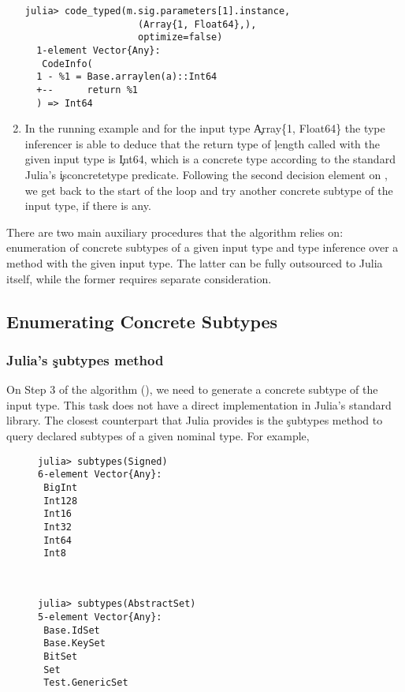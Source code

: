 \begin{enumerate}
\begin{minipage}{.92\textwidth}
\begin{lstlisting}[style=jterm]
  julia> code_typed(m.sig.parameters[1].instance,
                    (Array{1, Float64},),
                    optimize=false)
  1-element Vector{Any}:
   CodeInfo(
  1 - %1 = Base.arraylen(a)::Int64
  +--      return %1
  ) => Int64
\end{lstlisting}
\end{minipage}

  \item In the running example and for the input type \c{Array\{1, Float64\}}
  the type inferencer is able to deduce that the return type of \c{length}
  called with the given input type is \c{Int64}, which is a concrete type
  according to the standard Julia's \c{isconcretetype} predicate.
  Following the second decision element on , we get back to
  the start of the loop and try another concrete subtype of the input type,
  if there is any.
\end{enumerate}

There are two main auxiliary procedures that the algorithm relies on: enumeration of
concrete subtypes of a given input type and type inference over a method with the
given input type. The latter can be fully outsourced to Julia itself, while the
former requires separate consideration.

\subsection{Enumerating Concrete Subtypes}%
\label{sec:approx:enu}

\subsubsection{Julia's \c{subtypes} method}

On Step 3 of the algorithm (), we need to generate a
concrete subtype of the input type. This task does not have a direct
implementation in Julia's standard library. The closest counterpart that Julia
provides is the \c{subtypes} method to query declared subtypes of a given
nominal type. For example,
\begin{figure}[h]
\begin{minipage}{.49\textwidth}
\begin{lstlisting}[style=jterm]
julia> subtypes(Signed)
6-element Vector{Any}:
 BigInt
 Int128
 Int16
 Int32
 Int64
 Int8
\end{lstlisting}
\end{minipage}
~
\begin{minipage}{.49\textwidth}
\begin{lstlisting}[style=jterm]
julia> subtypes(AbstractSet)
5-element Vector{Any}:
 Base.IdSet
 Base.KeySet
 BitSet
 Set
 Test.GenericSet

\end{lstlisting}
\end{minipage}
\end{figure}


